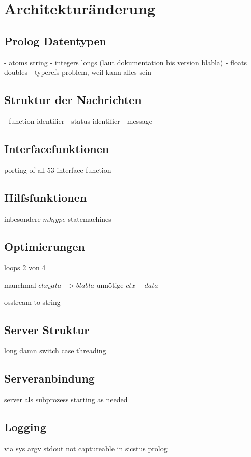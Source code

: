 


\section{Architekturänderung}

\subsection{Prolog Datentypen}

- atoms string
- integers longs (laut dokumentation bis version blabla)
- floats doubles
- typerefs problem, weil kann alles sein

\subsection{Struktur der Nachrichten}

- function identifier
- status identifier
- message


\subsection{Interfacefunktionen}

porting of all 53 interface function



\subsection{Hilfsfunktionen}

inbesondere $mk_type$
statemachines




\subsection{Optimierungen}
\label{subsec:optimizations}

loops 2 von 4

manchmal $ctx_data -> blabla$ unnötige $ctx-data$

osstream to string


\subsection{Server Struktur}

long damn switch case
threading





\subsection{Serveranbindung}

server als subprozess
starting as needed

\subsection{Logging}

via sys argv
stdout not captureable in sicstus prolog



